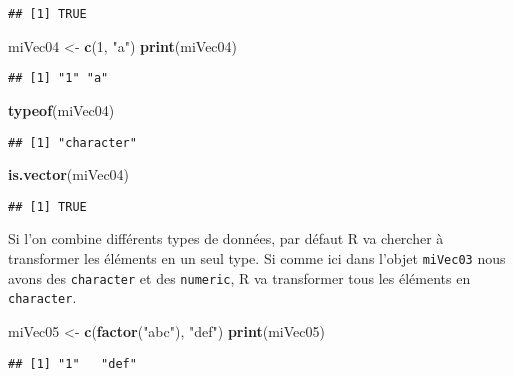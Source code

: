 \documentclass[]{book}
\newenvironment{Shaded}{\begin{snugshade}}{\end{snugshade}}
\newcommand{\KeywordTok}[1]{\textcolor[rgb]{0.13,0.29,0.53}{\textbf{#1}}}
\newcommand{\DecValTok}[1]{\textcolor[rgb]{0.00,0.00,0.81}{#1}}
\newcommand{\StringTok}[1]{\textcolor[rgb]{0.31,0.60,0.02}{#1}}
\newcommand{\NormalTok}[1]{#1}
\theoremstyle{definition}
\theoremstyle{definition}
\theoremstyle{definition}
\theoremstyle{remark}
\begin{document}
\begin{verbatim}
## [1] TRUE
\end{verbatim}

\begin{Shaded}
\begin{Highlighting}[]
\NormalTok{miVec04 <-}\StringTok{ }\KeywordTok{c}\NormalTok{(}\DecValTok{1}\NormalTok{, }\StringTok{"a"}\NormalTok{)}
\KeywordTok{print}\NormalTok{(miVec04)}
\end{Highlighting}
\end{Shaded}

\begin{verbatim}
## [1] "1" "a"
\end{verbatim}

\begin{Shaded}
\begin{Highlighting}[]
\KeywordTok{typeof}\NormalTok{(miVec04)}
\end{Highlighting}
\end{Shaded}

\begin{verbatim}
## [1] "character"
\end{verbatim}

\begin{Shaded}
\begin{Highlighting}[]
\KeywordTok{is.vector}\NormalTok{(miVec04)}
\end{Highlighting}
\end{Shaded}

\begin{verbatim}
## [1] TRUE
\end{verbatim}

Si l'on combine différents types de données, par défaut R va chercher à
transformer les éléments en un seul type. Si comme ici dans l'objet
\texttt{miVec03} nous avons des \texttt{character} et des
\texttt{numeric}, R va transformer tous les éléments en
\texttt{character}.

\begin{Shaded}
\begin{Highlighting}[]
\NormalTok{miVec05 <-}\StringTok{ }\KeywordTok{c}\NormalTok{(}\KeywordTok{factor}\NormalTok{(}\StringTok{"abc"}\NormalTok{), }\StringTok{"def"}\NormalTok{)}
\KeywordTok{print}\NormalTok{(miVec05)}
\end{Highlighting}
\end{Shaded}

\begin{verbatim}
## [1] "1"   "def"
\end{verbatim}
\end{document}
